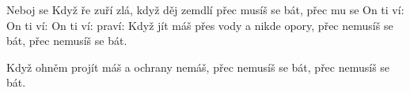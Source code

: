 \begin{TEXT}{Neboj se}
\SLOKA	Když ře zuří zlá,\NL
  	když děj zemdlí\NL
	přec musíš se bát,\NL
	přec mu se 
\REFREN  	On ti ví: \NL
	On ti ví: \NL
	On ti ví: \NL
	praví: 
\SLOKA	Když jít máš přes vody\NL
	a nikde opory,\NL
	přec nemusíš se bát,\NL
	přec nemusíš se bát.  
\REFREN 

\SLOKA	Když ohněm projít máš\NL
	a ochrany nemáš,\NL
	přec nemusíš se bát,\NL 
	přec nemusíš se bát. 
\REFREN 
\end{TEXT}
